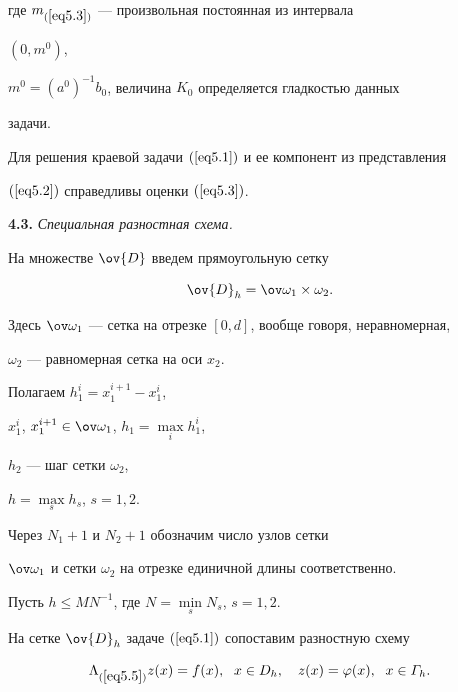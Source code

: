 где $m_{(\ref{eq5.3})}$ --- произвольная постоянная из интервала


$(0, m^0)$,


$m^0=(a^0)^{-1} b_0$, величина $K_0$ определяется гладкостью данных


задачи.





\begin{thms}


Для решения краевой задачи $(\ref{eq5.1})$ и ее компонент из представления


$(\ref{eq5.2})$ справедливы оценки $(\ref{eq5.3})$.


\end{thms}





{\bf 4.3.} {\it Специальная разностная схема.}


На множестве $\ov{D}$ введем прямоугольную сетку


\begin{equation}


\label{eq5.4}


\ov{D}_h=\ovo_1\times \omega_2.


\end{equation}


Здесь $\ovo_1$ --- сетка на отрезке $[0, d]$, вообще говоря, неравномерная,


$\omega_2$ --- равномерная сетка на оси $x_2$.


Полагаем $h_1^i=x^{i+1}_1-x_1^i$,


$x_1^i$, $x_1^{i+1}\in\ovo_1$, $h_1=\max\limits_i h_1^i$,


$h_2$ --- шаг сетки $\omega_2$,


$h=\max\limits_s h_s$, $s=1,2$.


Через $N_1+1$ и $N_2+1$ обозначим число узлов сетки


$\ovo_1$ и сетки $\omega_2$ на отрезке единичной длины соответственно.


Пусть $h\le M N^{-1}$, где $N=\min\limits_s N_s$, $s=1,2$.


На сетке $\ov{D}_h$ задаче $(\ref{eq5.1})$ сопоставим разностную схему


\begin{equation}


\label{eq5.5}


\Lambda_{(\ref{eq5.5})}z(x)=f(x),\ \; x\in D_h,


\quad  z(x)=\f(x),\ \; x\in\varGamma_h.


\end{equation}


